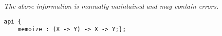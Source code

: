 \label{api:Memoize}

{\tiny \it The above information is manually maintained and may contain errors.}
\begin{verbatim}
api {
    memoize : (X -> Y) -> X -> Y;};
\end{verbatim}
